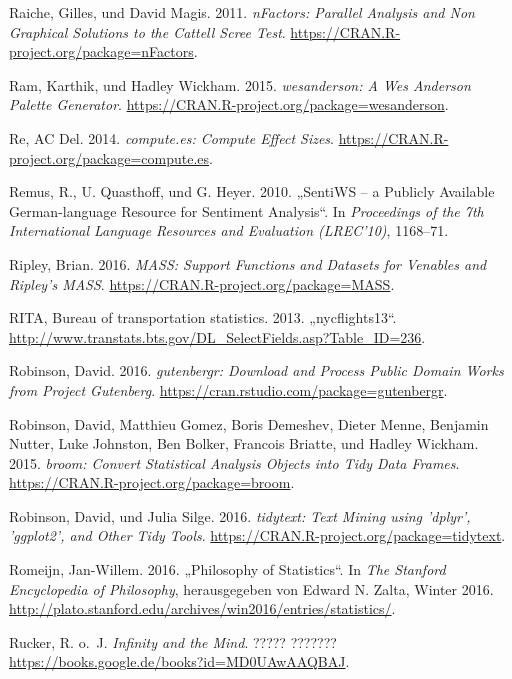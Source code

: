 \documentclass[12pt,ngerman,]{book}
\begin{document}
\hypertarget{ref-R-nFactors}{}
Raiche, Gilles, und David Magis. 2011. \emph{nFactors: Parallel Analysis
and Non Graphical Solutions to the Cattell Scree Test}.
\url{https://CRAN.R-project.org/package=nFactors}.

\hypertarget{ref-R-wesanderson}{}
Ram, Karthik, und Hadley Wickham. 2015. \emph{wesanderson: A Wes
Anderson Palette Generator}.
\url{https://CRAN.R-project.org/package=wesanderson}.

\hypertarget{ref-R-compute.es}{}
Re, AC Del. 2014. \emph{compute.es: Compute Effect Sizes}.
\url{https://CRAN.R-project.org/package=compute.es}.

\hypertarget{ref-remquahey2010}{}
Remus, R., U. Quasthoff, und G. Heyer. 2010. „SentiWS -- a Publicly
Available German-language Resource for Sentiment Analysis``. In
\emph{Proceedings of the 7th International Language Resources and
Evaluation (LREC'10)}, 1168--71.

\hypertarget{ref-R-MASS}{}
Ripley, Brian. 2016. \emph{MASS: Support Functions and Datasets for
Venables and Ripley's MASS}.
\url{https://CRAN.R-project.org/package=MASS}.

\hypertarget{ref-nycflights13}{}
RITA, Bureau of transportation statistics. 2013. „nycflights13``.
\url{http://www.transtats.bts.gov/DL_SelectFields.asp?Table_ID=236}.

\hypertarget{ref-R-gutenbergr}{}
Robinson, David. 2016. \emph{gutenbergr: Download and Process Public
Domain Works from Project Gutenberg}.
\url{https://cran.rstudio.com/package=gutenbergr}.

\hypertarget{ref-R-broom}{}
Robinson, David, Matthieu Gomez, Boris Demeshev, Dieter Menne, Benjamin
Nutter, Luke Johnston, Ben Bolker, Francois Briatte, und Hadley Wickham.
2015. \emph{broom: Convert Statistical Analysis Objects into Tidy Data
Frames}. \url{https://CRAN.R-project.org/package=broom}.

\hypertarget{ref-R-tidytext}{}
Robinson, David, und Julia Silge. 2016. \emph{tidytext: Text Mining
using 'dplyr', 'ggplot2', and Other Tidy Tools}.
\url{https://CRAN.R-project.org/package=tidytext}.

\hypertarget{ref-sep-statistics}{}
Romeijn, Jan-Willem. 2016. „Philosophy of Statistics``. In \emph{The
Stanford Encyclopedia of Philosophy}, herausgegeben von Edward N. Zalta,
Winter 2016.
\url{http://plato.stanford.edu/archives/win2016/entries/statistics/}.

\hypertarget{ref-ruckerinfinity}{}
Rucker, R. o.~J. \emph{Infinity and the Mind}. ????? ???????
\url{https://books.google.de/books?id=MD0UAwAAQBAJ}.
\end{document}
